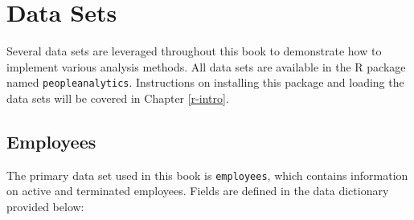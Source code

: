 \documentclass[
]{book}
\begin{document}
\hypertarget{data-sets}{%
\section{Data Sets}\label{data-sets}}

Several data sets are leveraged throughout this book to demonstrate how to implement various analysis methods. All data sets are available in the R package named \texttt{peopleanalytics}. Instructions on installing this package and loading the data sets will be covered in Chapter \ref{r-intro}.

\hypertarget{employees}{%
\subsection{Employees}\label{employees}}

The primary data set used in this book is \texttt{employees}, which contains information on active and terminated employees. Fields are defined in the data dictionary provided below:
\end{document}
